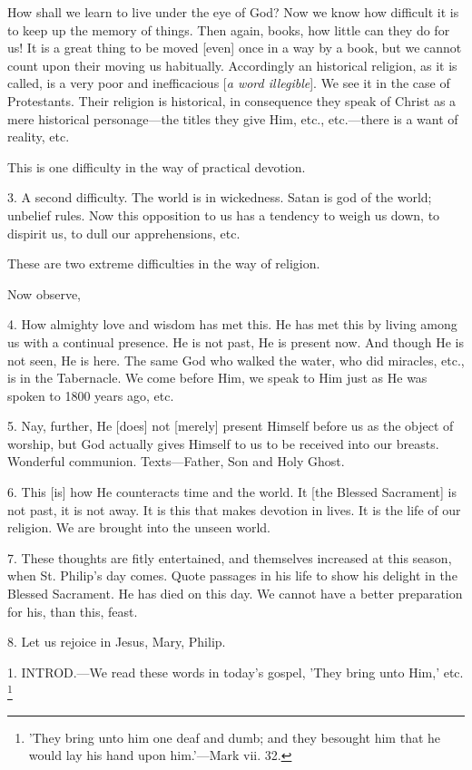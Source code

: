 How shall we learn to live under the eye of God?
Now we know how difficult it is to keep up the memory of things. Then
again, books, how little can they do for us! It is a great thing to be
moved [even] once in a way by a book, but we cannot count upon their
moving us habitually. Accordingly an historical religion, as it is
called, is a very poor and inefficacious [\emph{a word illegible}]. We
see it in the case of Protestants. Their religion is historical, in
consequence they speak of Christ as a mere historical personage—the
titles they give Him, etc., etc.—there is a want of reality, etc.

This is one difficulty in the way of practical
devotion.

3. A second difficulty. The world is in
wickedness. Satan is god of the world; unbelief rules. Now this
opposition to us has a tendency to weigh us down, to dispirit us, to
dull our apprehensions, etc.

These are two extreme difficulties in the way of
religion.

Now observe,

4. How almighty love and wisdom has met this. He
has met this by living among us with a continual presence. He is not
past, He is present now. And though He is not seen, He is here. The
same God who walked the water, who did miracles, etc., is in the
Tabernacle. We come before Him, we speak to Him just as He was spoken
to 1800 years ago, etc.

5. Nay, further, He [does] not [merely] present
Himself before us as the object of worship, but God actually gives
Himself to us to be received into our breasts. Wonderful communion.
Texts—Father, Son and Holy Ghost.

6. This [is] how He counteracts time and the
world. It [the Blessed Sacrament] is not past, it is not away. It is
this that makes devotion in lives. It is the life of our religion. We
are brought into the unseen world.

7. These thoughts are fitly entertained, and
themselves increased at this season, when St. Philip's day comes.
Quote passages in his life to show his delight in the Blessed
Sacrament. He has died on this day. We cannot have a better
preparation for his, than this, feast.

8. Let us rejoice in Jesus, Mary, Philip.


1. INTROD.—We
read these words in today's gospel, 'They bring unto Him,' etc. \footnote{'They bring unto him one
deaf and dumb; and they besought him that he would lay his hand upon
him.'—Mark vii. 32.}

